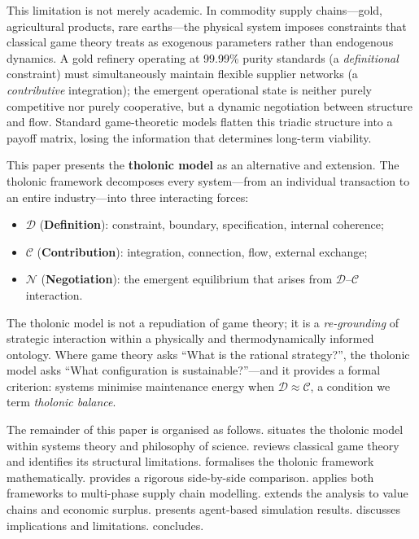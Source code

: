 \documentclass[12pt,a4paper,twocolumn]{article}
\newcommand{\N}{\mathcal{N}}
\newcommand{\D}{\mathcal{D}}
\newcommand{\CC}{\mathcal{C}}
\begin{document}
This limitation is not merely academic.
In commodity supply chains---gold, agricultural products, rare earths---the physical system imposes constraints that classical game theory treats as exogenous parameters rather than endogenous dynamics.
A gold refinery operating at 99.99\% purity standards (a \emph{definitional} constraint) must simultaneously maintain flexible supplier networks (a \emph{contributive} integration); the emergent operational state is neither purely competitive nor purely cooperative, but a dynamic negotiation between structure and flow.
Standard game-theoretic models flatten this triadic structure into a payoff matrix, losing the information that determines long-term viability.

This paper presents the \textbf{tholonic model} as an alternative and extension.
The tholonic framework decomposes every system---from an individual transaction to an entire industry---into three interacting forces:

\begin{itemize}[nosep]
  \item $\D$ (\textbf{Definition}): constraint, boundary, specification, internal coherence;
  \item $\CC$ (\textbf{Contribution}): integration, connection, flow, external exchange;
  \item $\N$ (\textbf{Negotiation}): the emergent equilibrium that arises from $\D$--$\CC$ interaction.
\end{itemize}

The tholonic model is not a repudiation of game theory; it is a \emph{re-grounding} of strategic interaction within a physically and thermodynamically informed ontology.
Where game theory asks ``What is the rational strategy?'', the tholonic model asks ``What configuration is sustainable?''---and it provides a formal criterion: systems minimise maintenance energy when $\D \approx \CC$, a condition we term \emph{tholonic balance}.

The remainder of this paper is organised as follows.
 situates the tholonic model within systems theory and philosophy of science.
 reviews classical game theory and identifies its structural limitations.
 formalises the tholonic framework mathematically.
 provides a rigorous side-by-side comparison.
 applies both frameworks to multi-phase supply chain modelling.
 extends the analysis to value chains and economic surplus.
 presents agent-based simulation results.
 discusses implications and limitations.
 concludes.
\end{document}
